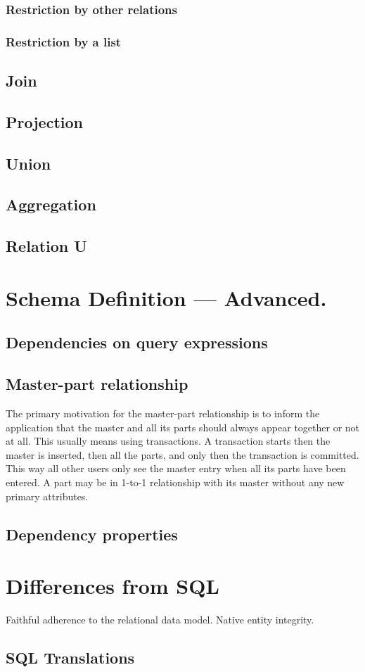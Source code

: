 \documentclass[letter,10pt]{article}
\begin{document}
\subsubsection{Restriction by other relations}
\subsubsection{Restriction by a list}

\subsection{Join}
\subsection{Projection}
\subsection{Union}
\subsection{Aggregation}
\subsection{Relation U}

\section{Schema Definition --- Advanced.}
\subsection{Dependencies on query expressions}
\subsection{Master-part relationship}
The primary motivation for the master-part relationship is to inform the application that the master and all its parts should always appear together or not at all.  
This usually means using transactions.  
A transaction starts then the master is inserted, then all the parts, and only then the transaction is committed.  
This way all other users only see the master entry when all its parts have been entered.
A part may be in 1-to-1 relationship with its master without any new primary attributes.
\subsection{Dependency properties}

\appendix

\section{Differences from SQL}
Faithful adherence to the relational data model. 
Native entity integrity.

\subsection{SQL Translations}



\end{document}
